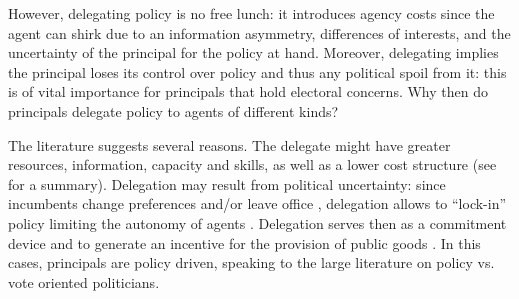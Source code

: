 \documentclass[12pt]{amsart}
\numberwithin{equation}{section}
\theoremstyle{definition}
\theoremstyle{definition}
\theoremstyle{definition}
\begin{document}
 However, delegating policy is no free lunch: it introduces agency costs since the agent can shirk due to an information asymmetry, differences of interests, and the uncertainty of the principal for the policy at hand. Moreover, delegating implies the principal loses its control over policy and thus any political spoil from it: this is of vital importance for principals that hold electoral concerns. Why then do principals delegate policy to agents of different kinds? %

 
   
The literature suggests several reasons. The delegate might have greater resources, information, capacity and skills, as well as a lower cost structure (see \citet{bolton_dewatripont_2005} for a summary). Delegation may result from political uncertainty: since incumbents change preferences and/or leave office \citep{moe_1989, shepsle_1992, horn_1995}, delegation  allows to ``lock-in'' policy limiting the autonomy of agents \citep{de_figueiredo_2002}.  Delegation serves then as a commitment device \citep{schelling_1960} and to generate an incentive for the provision of public goods \citep{aguion_tirole_1997}. In this cases, principals are policy driven, speaking to the large literature on policy vs. vote oriented politicians. 
  
\end{document}
